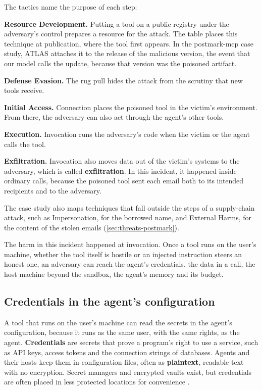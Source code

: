 The tactics name the purpose of each step:
\bi
\item \textbf{Resource Development.} Putting a tool on a public registry under the adversary's
control prepares a resource for the attack. The table places this technique at publication, where
the tool first appears. In the postmark-mcp case study, ATLAS attaches it to the release of the
malicious version, the event that our model calls the update, because that version was the
poisoned artifact.
\item \textbf{Defense Evasion.} The rug pull hides the attack from the scrutiny that new tools
receive.
\item \textbf{Initial Access.} Connection places the poisoned tool in the victim's environment.
From there, the adversary can also act through the agent's other tools.
\item \textbf{Execution.} Invocation runs the adversary's code when the victim or the agent calls
the tool.
\item \textbf{Exfiltration.} Invocation also moves data out of the victim's systems to the
adversary, which is called \textbf{exfiltration}. In this incident, it happened inside ordinary
calls, because the poisoned tool sent each email both to its intended recipients and to the
adversary.
\ei

The case study also maps techniques that fall outside the steps of a supply-chain attack, such as
Impersonation, for the borrowed name, and External Harms, for the content of the stolen emails
(\cref{sec:threats-postmark}).

The harm in this incident happened at invocation. Once a tool runs on the user's machine, whether
the tool itself is hostile or an injected instruction steers an honest one, an adversary can reach
the agent's credentials, the data in a call, the host machine beyond the sandbox, the agent's memory
and its budget.

\subsection{Credentials in the agent's configuration}
\label{sec:attacks-credentials}

A tool that runs on the user's machine can read the secrets in the agent's configuration, because it
runs as the same user, with the same rights, as the agent. \textbf{Credentials} are secrets that
prove a program's right to use a service, such as API keys, access tokens and the connection strings
of databases. Agents and their hosts keep them in configuration files, often as \textbf{plaintext},
readable text with no encryption. Secret managers and encrypted vaults exist, but credentials are
often placed in less protected locations for convenience \citep{mitre-atlas-2026}.

